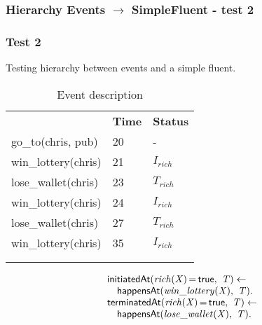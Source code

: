 \documentclass[8pt]{beamer}
\DeclareMathOperator{\val}{=}  %
\def \patsize {}
\def\happensAt{\textsf{\patsize happensAt}}
\def\initiatedAt{\textsf{\patsize initiatedAt}}
\def\terminatedAt{\textsf{\patsize terminatedAt}}
\def\true{\textsf{\patsize true}}
\newenvironment{mysplit}%
  {\arraycolsep 0pt \begin{array}{l}}%
  {\end{array}}
\begin{document}
\begin{frame}
    \frametitle{Hierarchy Events $\rightarrow$ SimpleFluent - test 2}
    \subsubsection{Test 2}
    \small Testing hierarchy between events and a simple fluent.\linebreak
    \begin{minipage}{0.48\linewidth}
        \begin{table}[t!]
            \caption{Event description}
            \begin{center}

                \begin{tabular}{lll}
                    \hline\noalign{\smallskip}
                    \multicolumn{1}{l}{\textbf{Event}} & \multicolumn{1}{c}{\textbf{Time}} & \multicolumn{1}{c}{\textbf{Status}}  \\
                    go\_to(chris, pub)& 20 & -\\
                    win\_lottery(chris)&21 &$I_{rich}$\\
                    lose\_wallet(chris)& 23 &$T_{rich}$\\
                    win\_lottery(chris)& 24 &$I_{rich}$\\
                    lose\_wallet(chris)& 27 &$T_{rich}$\\
                    win\_lottery(chris)& 35&$I_{rich}$\\\\
                    \noalign{\smallskip}
                    \hline
                \end{tabular}
            \end{center}
        \end{table}
    \end{minipage}
    \begin{minipage}{0.48\linewidth}

        \begin{align*}
            \begin{mysplit}
                \initiatedAt\mathit{(rich(X)\val\true,\ T) \leftarrow}\\
                \quad    \happensAt\mathit{(win\_lottery(X),\ T).}\\
                \terminatedAt\mathit{(rich(X)\val\true,\ T) \leftarrow}\\
                \quad    \happensAt\mathit{(lose\_wallet(X),\ T)}.\\
            \end{mysplit}
        \end{align*}
    \end{minipage}


\end{frame}
\end{document}
